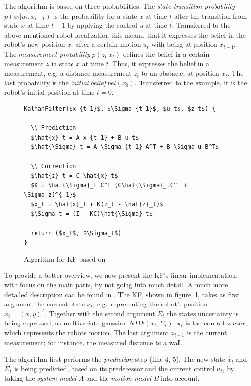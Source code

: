 The algorithm is based on three probabilities. The \emph{state transition probability} $p(x_t | u_t , x_{t-1})$ is the probability for a state $x$ at time $t$ after the transition from state $x$ at time $t-1$ by applying the control $u$ at time $t$. Transferred to the above mentioned robot localization this means, that it expresses the belief in the robot's new position $x_t$ after a certain motion $u_t$ with being at position $x_{t-1}$. The \emph{measurement probability} $p(z_t|x_t)$ defines the belief in a certain measurement $z$ in state $x$ at time $t$. Thus, it expresses the belief in a measurement, e.g. a distance measurement $z_t$ to an obstacle, at position $x_t$. The last probability is the \emph{initial belief} $bel(x_0)$. Transferred to the example, it is the robot's initial position at time $t = 0$.

\begin{figure}
\begin{lstlisting}[mathescape]
KalmanFilter($x_{t-1}$, $\Sigma_{t-1}$, $u_t$, $z_t$) {
	
  \\ Prediction
  $\hat{x}_t = A x_{t-1} + B u_t$
  $\hat{\Sigma}_t = A \Sigma_{t-1} A^T + B \Sigma_u B^T$

  \\ Correction
  $\hat{z}_t = C \hat{x}_t$
  $K = \hat{\Sigma}_t C^T (C\hat{\Sigma}_tC^T + \Sigma_z)^{-1}$
  $x_t = \hat{x}_t + K(z_t - \hat{z}_t)$
  $\Sigma_t = (I - KC)\hat{\Sigma}_t$
  
  return ($x_t$, $\Sigma_t$)
}
\end{lstlisting}
\caption{Algorithm for \acl{KF} based on \citet{thrun:prob_robo}}
\label{lst:kf}
\end{figure}

To provide a better overview, we now present the \acs{KF}'s linear implementation, with focus on the main parts, by not going into much detail. A much more detailed description can be found in \citet{thrun:prob_robo}. 
The \acs{KF}, shown in figure~\ref{lst:kf}, takes as first argument the current state $x_t$, e.g.\ representing the robot's position $x_t = (x, y)^T$. Together with the second argument $\Sigma_t$ the states uncertainty is being expressed, as multivariate gaussian $NDF(x_t, \Sigma_t)$. $u_t$ is the control vector, which represents the robots motion. The last argument $z_{t+1}$ is the current measurement; for instance, the measured distance to a wall.

The algorithm first performs the \emph{prediction} step (line 4, 5). The new state $\hat{x}_t$ and $\hat{\Sigma}_t$ is being predicted, based on its predecessor and the current control $u_t$, by taking the \emph{system model} $A$ and the \emph{motion model} $B$ into account.

